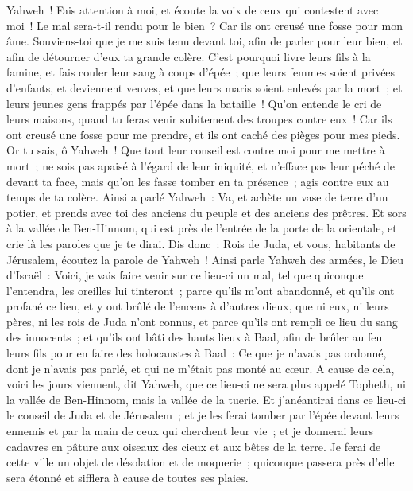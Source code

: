 \begin{multicols}{2}
Yahweh~! Fais attention à moi, et écoute la voix de ceux qui contestent avec moi~!
Le mal sera-t-il rendu pour le bien~? Car ils ont creusé une fosse pour mon âme. Souviens-toi que je me suis tenu devant toi, afin de parler pour leur bien, et afin de détourner d'eux ta grande colère.
C'est pourquoi livre leurs fils à la famine, et fais couler leur sang à coups d'épée~; que leurs femmes soient privées d'enfants, et deviennent veuves, et que leurs maris soient enlevés par la mort~; et leurs jeunes gens frappés par l'épée dans la bataille~!
Qu'on entende le cri de leurs maisons, quand tu feras venir subitement des troupes contre eux~! Car ils ont creusé une fosse pour me prendre, et ils ont caché des pièges pour mes pieds.
Or tu sais, ô Yahweh~! Que tout leur conseil est contre moi pour me mettre à mort~; ne sois pas apaisé à l'égard de leur iniquité, et n'efface pas leur péché de devant ta face, mais qu'on les fasse tomber en ta présence~; agis contre eux au temps de ta colère.
\VerseOne{}Ainsi a parlé Yahweh~: Va, et achète un vase de terre d'un potier, et prends avec toi des anciens du peuple et des anciens des prêtres.
Et sors à la vallée de Ben-Hinnom, qui est près de l'entrée de la porte de la orientale, et crie là les paroles que je te dirai.
Dis donc~: Rois de Juda, et vous, habitants de Jérusalem, écoutez la parole de Yahweh~! Ainsi parle Yahweh des armées, le Dieu d'Israël~: Voici, je vais faire venir sur ce lieu-ci un mal, tel que quiconque l'entendra, les oreilles lui tinteront~; 
parce qu'ils m'ont abandonné, et qu'ils ont profané ce lieu, et y ont brûlé de l'encens à d'autres dieux, que ni eux, ni leurs pères, ni les rois de Juda n'ont connus, et parce qu'ils ont rempli ce lieu du sang des innocents~;
et qu'ils ont bâti des hauts lieux à Baal, afin de brûler au feu leurs fils pour en faire des holocaustes à Baal~: Ce que je n'avais pas ordonné, dont je n'avais pas parlé, et qui ne m'était pas monté au cœur.
A cause de cela, voici les jours viennent, dit Yahweh, que ce lieu-ci ne sera plus appelé Topheth, ni la vallée de Ben-Hinnom, mais la vallée de la tuerie.
Et j'anéantirai dans ce lieu-ci le conseil de Juda et de Jérusalem~; et je les ferai tomber par l'épée devant leurs ennemis et par la main de ceux qui cherchent leur vie~; et je donnerai leurs cadavres en pâture aux oiseaux des cieux et aux bêtes de la terre.
Je ferai de cette ville un objet de désolation et de moquerie~; quiconque passera près d'elle sera étonné et sifflera à cause de toutes ses plaies.

\end{multicols}
